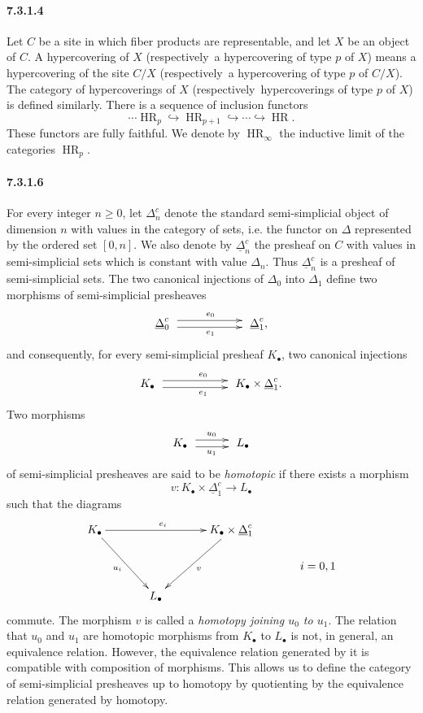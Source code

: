 \documentclass[11pt]{article}
\newcommand{\HR}{\operatorname{HR}}
\newcommand{\resp}{respectively}
\begin{document}
\paragraph*{7.3.1.4}
Let $C$ be a site in which fiber products are representable, and let $X$ be an object of $C$. A hypercovering of $X$ (\resp\ a hypercovering of type $p$ of $X$) means a hypercovering of the site $C/X$ (\resp\ a hypercovering of type $p$ of $C/X$). The category of hypercoverings of $X$ (\resp\ hypercoverings of type $p$ of $X$) is defined similarly. There is a sequence of inclusion functors
\[
        \cdots\HR_p\hookrightarrow \HR_{p+1}\hookrightarrow\cdots\hookrightarrow \HR .
\]
These functors are fully faithful. We denote by $\HR_\infty$ the inductive limit of the categories $\HR_p$.

\paragraph*{7.3.1.6}
For every integer $n\geq 0$, let $\Delta_n^c$ denote the standard semi-simplicial object of dimension $n$ with values in the category of sets, i.e. the functor on $\Delta$ represented by the ordered set $[0,n]$. We also denote by $\underline{\Delta}_n^c$ the presheaf on $C$ with values in semi-simplicial sets which is constant with value $\Delta_n$. Thus $\underline{\Delta}_n^c$ is a presheaf of semi-simplicial sets. The two canonical injections of $\Delta_0$ into $\Delta_1$ define two morphisms of semi-simplicial presheaves
\[
\xymatrix@C=2cm@M=.25cm{
\underline{\Delta}_0^c \ar@<3pt>[r]^{e_0} \ar@<-3pt>[r]_{e_1} & \underline{\Delta}_1^c,
}
\]
and consequently, for every semi-simplicial presheaf $K_\bullet$, two canonical injections
\[
\xymatrix@C=2cm@M=.25cm{
K_\bullet \ar@<3pt>[r]^{e_0} \ar@<-3pt>[r]_{e_1} & K_\bullet\times \underline{\Delta}_1^c .
}
\]
Two morphisms
\[
\xymatrix@C=1cm@M=.25cm{
K_\bullet \ar@<3pt>[r]^{u_0} \ar@<-3pt>[r]_{u_1} & L_\bullet
}
\]
of semi-simplicial presheaves are said to be \emph{homotopic} if there exists a morphism
\[
        v:K_\bullet\times \underline{\Delta}_1^c\to L_\bullet
\]
such that the diagrams
\[
\xymatrix@R=.5cm@C=1.25cm{
K_\bullet \ar[rr]^{e_i} \ar[rdd]_{u_i}&&K_\bullet\times\underline{\Delta}_1^c\ar[ldd]^v\\
&&&\txt{$i=0,1$}\\
&L_\bullet&
}
\]
commute. The morphism $v$ is called a \emph{homotopy joining $u_0$ to $u_1$}. The relation that $u_0$ and $u_1$ are homotopic morphisms from $K_\bullet$ to $L_\bullet$ is not, in general, an equivalence relation. However, the equivalence relation generated by it is compatible with composition of morphisms. This allows us to define the category of semi-simplicial presheaves up to homotopy by quotienting by the equivalence relation generated by homotopy.
\end{document}
